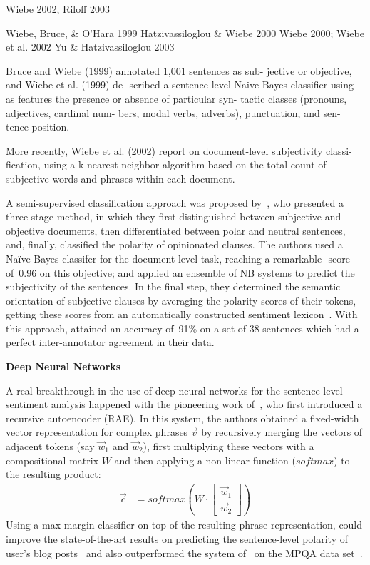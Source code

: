\cite{Nakagawa:10}

Wiebe 2002, Riloff 2003

Wiebe, Bruce, \& O'Hara 1999
Hatzivassiloglou \& Wiebe 2000
Wiebe 2000;
Wiebe et al. 2002
Yu \& Hatzivassiloglou 2003

Bruce and Wiebe (1999) annotated 1,001 sentences as sub- jective or
objective, and Wiebe et al. (1999) de- scribed a sentence-level Naive
Bayes classifier using as features the presence or absence of
particular syn- tactic classes (pronouns, adjectives, cardinal num-
bers, modal verbs, adverbs), punctuation, and sen- tence position.

More recently, Wiebe et al.  (2002) report on document-level
subjectivity classi- fication, using a k-nearest neighbor algorithm
based on the total count of subjective words and phrases within each
document.

A semi-supervised classification approach was proposed
by~\citet{Yu:03}, who presented a three-stage method, in which they
first distinguished between subjective and objective documents, then
differentiated between polar and neutral sentences, and, finally,
classified the polarity of opinionated clauses.  The authors used a
Na{\"i}ve Bayes classifer for the document-level task, reaching a
remarkable \F-score of~0.96 on this objective; and applied an ensemble
of NB systems to predict the subjectivity of the sentences.  In the
final step, they determined the semantic orientation of subjective
clauses by averaging the polarity scores of their tokens, getting
these scores from an automatically constructed sentiment
lexicon~\cite{Hatzivassi:97}.  With this approach, \citeauthor{Yu:03}
attained an accuracy of~91\% on a set of 38 sentences which had a
perfect inter-annotator agreement in their data.

\textbf{Deep Neural Networks}

\citet{Yessenalina:11}

A real breakthrough in the use of deep neural networks for the
sentence-level sentiment analysis happened with the pioneering work
of~\citet{Socher:11}, who first introduced a recursive autoencoder
(RAE).  In this system, the authors obtained a fixed-width vector
representation for complex phrases $\vec{v}$ by recursively merging
the vectors of adjacent tokens (say $\vec{w}_1$ and $\vec{w}_2$),
first multiplying these vectors with a compositional matrix $W$ and
then applying a non-linear function ($softmax$) to the resulting
product:
\begin{align*}
  \vec{c} &= softmax\left(W\cdot\begin{bmatrix}
  \vec{w}_1\\
  \vec{w}_2
  \end{bmatrix}\right)
\end{align*}
Using a max-margin classifier on top of the resulting phrase
representation, \citet{Socher:11} could improve the state-of-the-art
results on predicting the sentence-level polarity of user's blog
posts~\cite{Potts:10} and also outperformed the system
of~\citet{Nasukawa:03} on the MPQA data set~\cite{Wiebe:05}.

